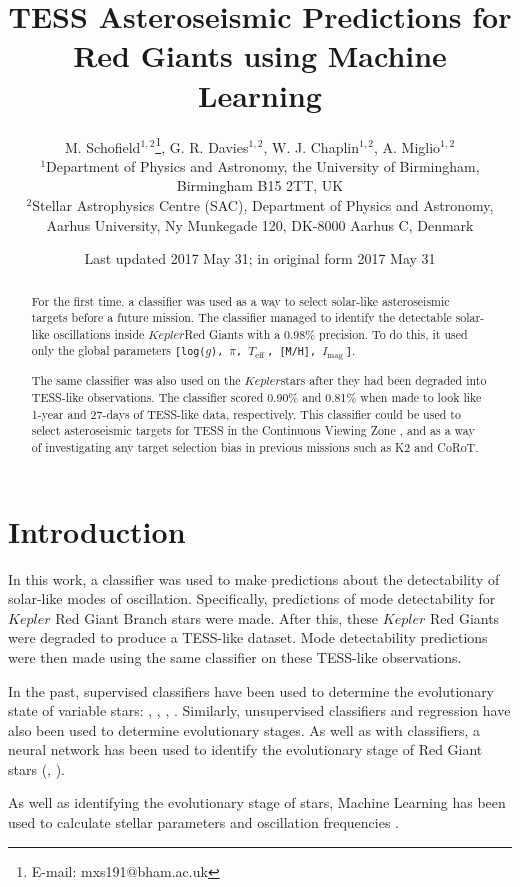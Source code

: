 \documentclass[a4paper,fleqn,usenatbib,useAMS]{mnras}
\title[Asteroseismology with Machine Learning]{TESS Asteroseismic Predictions for Red Giants using Machine Learning}
\author[M. Schofield et al.]{M. Schofield$^{1, 2}$\thanks{E-mail: mxs191@bham.ac.uk}, G. R. Davies$^{1, 2}$, W. J. Chaplin$^{1, 2}$, A. Miglio$^{1, 2}$
\\
$^{1}$Department of Physics and Astronomy, the University of Birmingham, Birmingham B15 2TT, UK \\
$^{2}$Stellar Astrophysics Centre (SAC), Department of Physics and Astronomy, Aarhus University, Ny Munkegade 120, DK-8000 Aarhus C, Denmark}
\date{Last updated 2017 May 31; in original form 2017 May 31}
\newcommand{\teff}{\ensuremath{T_{\textrm{eff}}\:}}
\newcommand{\kep}{\ensuremath{Kepler}\:}
\newcommand{\imag}{\ensuremath{I_{\textrm{mag}}\:}}
\begin{document}
\label{firstpage}
\pagerange{\pageref{firstpage}--\pageref{lastpage}}
\maketitle

\begin{abstract}
For the first time. a classifier was used as a way to select solar-like asteroseismic targets before a future mission. The classifier managed to identify the detectable solar-like oscillations inside \kep Red Giants with a 0.98\% precision. To do this, it used only the global parameters \texttt{[log($g$), $\pi$, \teff, [M/H], \imag]}.

The same classifier was also used on the \kep stars after they had been degraded into TESS-like observations. The classifier scored 0.90\% and 0.81\% when made to look like 1-year and 27-days of TESS-like data, respectively. This classifier could be used to select asteroseismic targets for TESS in the Continuous Viewing Zone \citep{ricker_transiting_2014}, and as a way of investigating any target selection bias in previous missions such as K2 and CoRoT.
\end{abstract}



\section{Introduction}

In this work, a classifier was used to make predictions about the detectability of solar-like modes of oscillation. Specifically, predictions of mode detectability for $Kepler$ Red Giant Branch stars were made. After this, these $Kepler$ Red Giants were degraded to produce a TESS-like dataset. Mode detectability predictions were then made using the same classifier on these TESS-like observations.

In the past, supervised classifiers have been used to determine the evolutionary state of variable stars: \citet{debosscher_automated_2007}, \citet{sarro_automated_2009}, \citet{nun_supervised_2014}, \citet{elorrieta_machine_2016}. Similarly, unsupervised classifiers \citep{valenzuela_unsupervised_2018} and regression \citep{ness_cannon_2015} have also been used to determine evolutionary stages. As well as with classifiers, a neural network has been used to identify the evolutionary stage of Red Giant stars (\citet{hon_deep_2017}, \citet{hon_deep_2018}).

As well as identifying the evolutionary stage of stars, Machine Learning has been used to calculate stellar parameters \citep{bellinger_fundamental_2016} and oscillation frequencies \citep{davies_oscillation_2016}.
\end{document}
